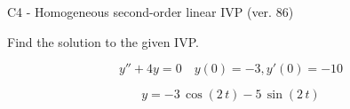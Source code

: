 \begin{exercise}
  \begin{exerciseTitle}C4 - Homogeneous second-order linear IVP (ver. 86)\end{exerciseTitle}
  \begin{exerciseStatement}
    
Find the solution to the given IVP.

    
\[y''+4y = 0 \hspace{1em} y(0) = -3 , y'(0) = -10\]

  \end{exerciseStatement}
  \begin{exerciseAnswer}
    
\[y= -3 \, \cos\left(2 \, t\right) - 5 \, \sin\left(2 \, t\right)\]

  \end{exerciseAnswer}
\end{exercise}